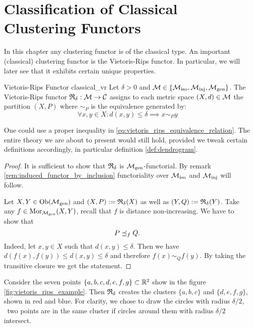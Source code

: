 \chapter{Classification of Classical Clustering Functors}
\label{chapter__classical}
In this chapter any clustering functor is of the classical type.
An important (classical) clustering functor is the Vietoris-Rips functor.
In particular, we will later see that it exhibits certain unique properties.

\begin{defprop}{Vietoris-Rips Functor \cite[Def.~6.1]{Carlsson2010}}{classical_vr}
    Let $\delta > 0$ and $\mathcal{M} \in \{{\mathcal{M}_\mathrm{iso}}, {\mathcal{M}_\mathrm{inj}}, {\mathcal{M}_\mathrm{gen}}\}$. The Vietoris-Rips functor $\mathfrak{R}_\delta: \mathcal{M} \to \mathcal{C}$ assigns to each metric space $(X,d) \in \mathcal{M}$ the partition $(X,P)$ where $\sim_P$ is the equivalence generated by:
    \begin{equation}
        \label{eq:vietoris_rips_equivalence_relation}
        \forall x,y \in X: d(x,y) \leq \delta \implies x \sim_P y
    \end{equation}
\end{defprop}

One could use a proper inequality in \eqref{eq:vietoris_rips_equivalence_relation}. The entire theory we are about to present would still hold, provided we tweak certain definitions accordingly, in particular definition \ref{def:dendrogram}.

\begin{proof}
It is sufficient to show that $\mathfrak{R}_\delta$ is ${\mathcal{M}_\mathrm{gen}}$-functorial. By remark \ref{rem:induced_functor_by_inclusion} functoriality over ${\mathcal{M}_\mathrm{iso}}$ and ${\mathcal{M}_\mathrm{inj}}$ will follow.

Let $X,Y \in \mathrm {Ob}({\mathcal{M}_\mathrm{gen}})$ and $(X,P) := \mathfrak{R}_\delta(X)$ as well as $(Y,Q) := \mathfrak{R}_\delta(Y)$.
Take any $f \in \mathrm {Mor}_{\mathcal{M}_\mathrm{gen}}(X,Y)$, recall that $f$ is distance non-increasing.
We have to show that 
$$P \preceq_f Q.$$
Indeed, let $x,y \in X$ such that $d(x,y) \leq \delta$.
Then we have $d(f(x), f(y)) \leq d(x,y) \leq \delta$ and therefore $f(x) \sim_{Q} f(y)$.
By taking the transitive closure we get the statement.
\end{proof}

Consider the seven points $\{a,b,c,d,e,f,g\} \subset \mathbb R^2$ show in the figure \ref{fig:vietoris_rips_example}. Then $\mathfrak{R}_\delta$ creates the clusters $\{a,b,c\}$ and $\{d,e,f,g\}$, shown in red and blue. For clarity, we chose to draw the circles with radius $\delta / 2$, \ie\ two points are in the same cluster if circles around them with radius $\delta / 2$ intersect.

